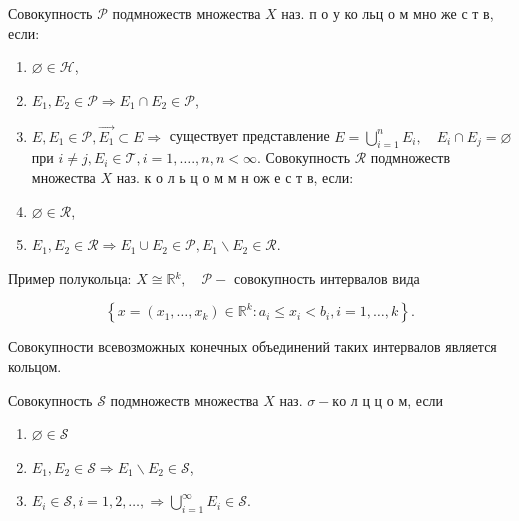 \documentclass[10pt]{article}
\begin{document}
Совокупность $\mathscr{P}$ подмножеств множества $X$ наз. п о у ко льц о м мно же с т в, если:



\begin{enumerate}

  \item $\varnothing \in \mathscr{H}$,



  \item $E_{1}, E_{2} \in \mathscr{P} \Rightarrow E_{1} \cap E_{2} \in \mathscr{P}$,



  \item $E, E_{1} \in \mathscr{P}, \overrightarrow{E_{1}} \subset E \Rightarrow$ существует представление $E=\bigcup_{i=1}^{n} E_{i}, \quad E_{i} \cap E_{j}=\varnothing$ при $i \neq j, E_{i} \in \mathscr{T}, i=1, \ldots ., n, n<\infty$. Совокупность $\mathscr{R}$ подмножеств множества $X$ наз. к о л ь ц о м м н ож е с т в, если:



  \item $\varnothing \in \mathscr{R}$,



  \item $E_{1}, E_{2} \in \mathscr{R} \Rightarrow E_{1} \cup E_{2} \in \mathscr{P}, E_{1} \backslash E_{2} \in \mathscr{R}$.



\end{enumerate}



Пример полукольца: $X \cong \mathbb{R}{ }^{k}, \quad \mathscr{P}-$ совокупность интервалов вида



\[

\left\{x=\left(x_{1}, \ldots, x_{k}\right) \in \mathbb{R}^{k}: a_{i} \leqslant x_{i}<b_{i}, i=1, \ldots, k\right\} .

\]



Совокупности всевозможных конечных объединений таких интервалов является кольцом.



Совокупность $\mathscr{S}$ подмножеств множества $X$ наз. $\sigma-к о$ л ц ц о м, если



\begin{enumerate}

  \item $\varnothing \in \mathscr{S}$



  \item $E_{1}, E_{2} \in \mathscr{S} \Rightarrow E_{1} \backslash E_{2} \in \mathscr{S}$,



  \item $E_{i} \in \mathscr{S}, i=1,2, \ldots, \Rightarrow \bigcup_{i=1}^{\infty} E_{i} \in \mathscr{S}$.



\end{enumerate}
\end{document}
